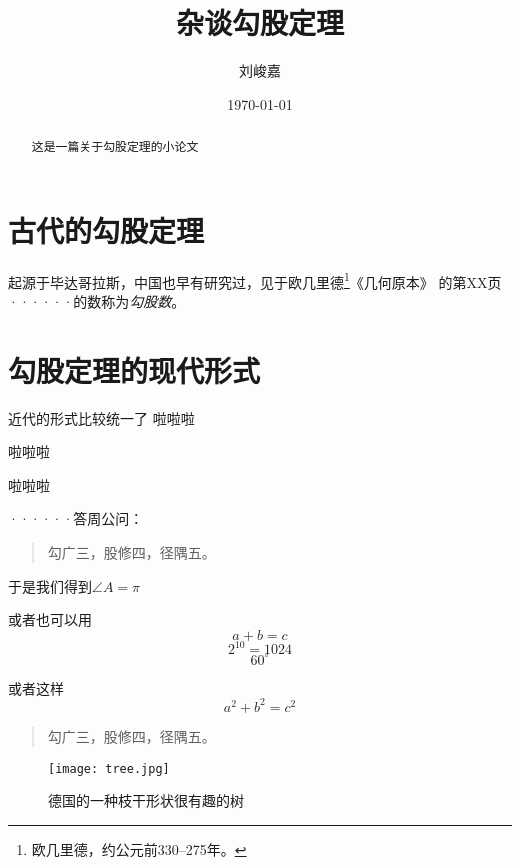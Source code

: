 \documentclass[UTF8]{ctexart}%
\title{\heiti 杂谈勾股定理}
\author{\kaishu 刘峻嘉}
\date{\today}
\begin{document}
\maketitle  %
\begin{abstract}
     这是一篇关于勾股定理的小论文
\end{abstract}
\tableofcontents %
\section{古代的勾股定理}
起源于毕达哥拉斯，中国也早有研究过，见于欧几里德\footnote{欧几里德，约公元前330--275年。}《几何原本》
的第XX页%
······的数称为\emph{勾股数}。%
\section{勾股定理的现代形式}
近代的形式比较统一了
啦啦啦


啦啦啦

啦啦啦  %

······答周公问：
\begin{quote}
\kaishu   %
     勾广三，股修四，径隅五。
\end{quote}         

于是我们得到$\angle A=\pi$

或者也可以用
\begin{equation}
     a+b=c
\end{equation}      %
\begin{equation}
2^{10}=1024
\end{equation}
\begin{equation}  
60^\circ            %
\end{equation}

或者这样
\[a^2+b^2=c^2\]  %
\begin{quotation}        %
     勾广三，股修四，径隅五。
\end{quotation}
\begin{figure}[ht]  %
     \centering
     \texttt{[image: tree.jpg]}
     \caption{德国的一种枝干形状很有趣的树}       %
     \label{fig:tower}        %
\end{figure}
\end{document}
